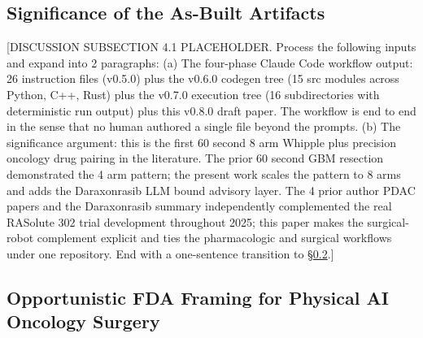 %

\subsection{Significance of the As-Built Artifacts}
\label{sec:discussion-significance}

[DISCUSSION SUBSECTION 4.1 PLACEHOLDER. Process the following inputs and expand into 2 paragraphs:
(a) The four-phase Claude Code workflow output: 26 instruction files (v0.5.0) plus the v0.6.0 codegen tree (15 src modules across Python, C++, Rust) plus the v0.7.0 execution tree (16 subdirectories with deterministic run output) plus this v0.8.0 draft paper. The workflow is end to end in the sense that no human authored a single file beyond the prompts.
(b) The significance argument: this is the first 60 second 8 arm Whipple plus precision oncology drug pairing in the literature. The prior 60 second GBM resection \cite{kawchak_2026_20113157} demonstrated the 4 arm pattern; the present work scales the pattern to 8 arms and adds the Daraxonrasib LLM bound advisory layer. The 4 prior author PDAC papers \cite{kawchak_2025_15735068, kawchak_2025_16415815, kawchak_2025_17001137, kawchak_2025_17239510} and the Daraxonrasib summary \cite{kawchak_2025_18099351} independently complemented the real RASolute 302 trial development throughout 2025; this paper makes the surgical-robot complement explicit and ties the pharmacologic and surgical workflows under one repository.
End with a one-sentence transition to \S \ref{sec:discussion-fda}.]

\subsection{Opportunistic FDA Framing for Physical AI Oncology Surgery}
\label{sec:discussion-fda}

